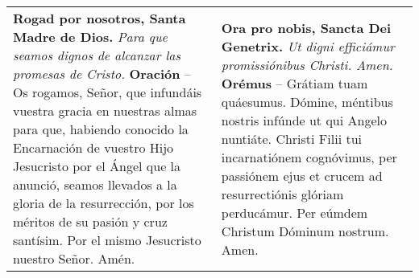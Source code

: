\documentclass[./devocionario.tex]{subfiles}
\begin{document}
\begin{tabular} { p{} p{} }
    \textbf{Rogad por nosotros, Santa Madre de Dios.}\newline
    \textit{Para que seamos dignos de alcanzar las promesas de Cristo.}\newline
    \textbf{Oración} -- Os rogamos, Señor, que infundáis vuestra gracia en nuestras almas para que, 
    habiendo conocido la Encarnación de vuestro Hijo Jesucristo por el Ángel que la anunció, 
    seamos llevados a la gloria de la resurrección, por los méritos de su pasión y cruz santísim. 
    Por el mismo Jesucristo nuestro Señor. Amén.

    &

    \textbf{Ora pro nobis, Sancta Dei Genetrix.}\newline
    \textit{Ut digni efficiámur promissiónibus Christi. Amen.}\newline
    \textbf{Orémus} -- Grátiam tuam quáesumus. Dómine, méntibus nostris infúnde ut qui Angelo nuntiáte. 
    Christi Filii tui incarnatiónem cognóvimus, per passiónem ejus et crucem ad resurrectiónis glóriam perducámur. 
    Per eúmdem Christum Dóminum nostrum. Amen.
\end{tabular}
\end{document}
